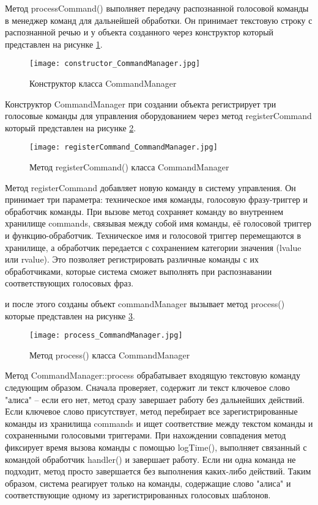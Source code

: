 Метод processCommand() выполняет передачу распознанной голосовой команды в менеджер команд для дальнейшей обработки. Он принимает текстовую строку с распознанной речью и у объекта созданного через конструктор который представлен на рисунке \ref{fig:constructor_CommandManager}.


\begin{figure}[H]
	\centering
	\texttt{[image: constructor\_CommandManager.jpg]}
	\caption{Конструктор класса CommandManager}
	\label{fig:constructor_CommandManager}
\end{figure}

Конструктор CommandManager при создании объекта регистрирует три голосовые команды для управления оборудованием через метод registerCommand который представлен на рисунке \ref{fig:registerCommand_CommandManager}.

\begin{figure}[H]
	\centering
	\texttt{[image: registerCommand\_CommandManager.jpg]}
	\caption{Метод registerCommand()  класса CommandManager}
	\label{fig:registerCommand_CommandManager}
\end{figure}

Метод registerCommand добавляет новую команду в систему управления. Он принимает три параметра: техническое имя команды, голосовую фразу-триггер и обработчик команды. При вызове метод сохраняет команду во внутреннем хранилище commands, связывая между собой имя команды, её голосовой триггер и функцию-обработчик. Техническое имя и голосовой триггер перемещаются в хранилище, а обработчик передается с сохранением категории значения (lvalue или rvalue). Это позволяет регистрировать различные команды с их обработчиками, которые система сможет выполнять при распознавании соответствующих голосовых фраз.

 и после этого созданы объект commandManager вызывает метод process() которые представлен на рисунке \ref{fig:process_CommandManager}.

\begin{figure}[H]
	\centering
	\texttt{[image: process\_CommandManager.jpg]}
	\caption{Метод process()  класса CommandManager}
	\label{fig:process_CommandManager}
\end{figure}

Метод CommandManager::process обрабатывает входящую текстовую команду следующим образом. Сначала проверяет, содержит ли текст ключевое слово "алиса" -- если его нет, метод сразу завершает работу без дальнейших действий. Если ключевое слово присутствует, метод перебирает все зарегистрированные команды из хранилища commands и ищет соответствие между текстом команды и сохраненными голосовыми триггерами. При нахождении совпадения метод фиксирует время вызова команды с помощью logTime(), выполняет связанный с командой обработчик handler() и завершает работу. Если ни одна команда не подходит, метод просто завершается без выполнения каких-либо действий. Таким образом, система реагирует только на команды, содержащие слово "алиса" и соответствующие одному из зарегистрированных голосовых шаблонов.

\newpage
